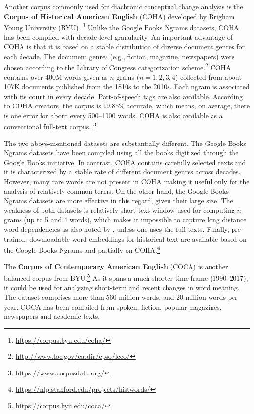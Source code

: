 \documentclass[output=paper]{langsci/langscibook}
\begin{document}
Another corpus commonly used for diachronic conceptual change analysis is the \textbf{Corpus of Historical American English} (COHA) developed by Brigham Young University (BYU) \citep{davies2012expanding}.\footnote{\url{https://corpus.byu.edu/coha/}} Unlike the Google Books Ngrams datasets, COHA has been compiled with decade-level granularity. An important advantage of COHA is that it is based on a stable distribution of diverse document genres for each decade. The document genres (e.g.,  fiction, magazine, newspapers) were chosen according to the Library of Congress categorization scheme.\footnote{\url{http://www.loc.gov/catdir/cpso/lcco/}} COHA contains over 400M words given as $n$-grams ($n={1,2,3,4}$) collected from about 107K documents published from the 1810s to the 2010s. Each ngram is associated with its count in every decade. Part-of-speech tags are also available. According to COHA creators, the corpus is 99.85\% accurate,
which means, on average, there is one error for about every 500--1000 words. COHA is also available as a conventional full-text corpus. \footnote{\url{https://www.corpusdata.org/}}

The two above-mentioned datasets are substantially different. The Google Books Ngrams datasets have been compiled using all the books digitized through the
Google Books initiative. In contrast, COHA contains carefully selected texts and it is characterized by a stable rate of different document genres across decades. However, many rare words are not present in COHA making it useful only for the analysis of relatively common terms. On the other hand, the Google Books Ngrams datasets are more effective in this regard, given their large size. 
The weakness of both datasets is relatively short text window used for computing $n$-grams (up to 5 and 4 words), which makes it impossible to capture long distance word dependencies as also noted by \citet{tang-2018}, unless one uses the full texts. Finally, pre-trained, downloadable word embeddings for historical text are available \citep{hamilton-etal-2016-diachronic} based on the Google Books Ngrams and partially on COHA.\footnote{\url{https://nlp.stanford.edu/projects/histwords/}}

The \textbf{Corpus of Contemporary American English} (COCA) \citep{davies2010} is another balanced corpus from BYU.\footnote{\url{https://corpus.byu.edu/coca/}} As it spans a much shorter time frame (1990--2017), it could be used for analyzing short-term and recent changes in word meaning. The dataset comprises more than 560 million words, and 20 million words per year. COCA has been compiled from spoken, fiction, popular magazines, newspapers and academic texts.
\end{document}
